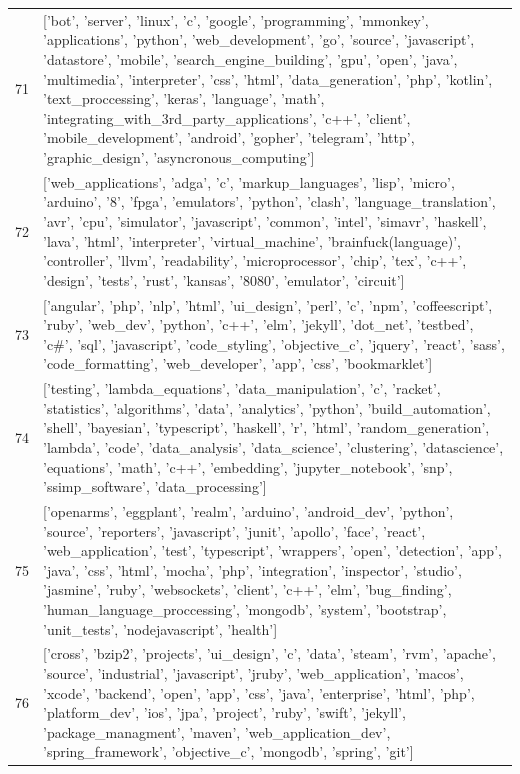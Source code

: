 \begin{center}
\begin{longtable}{|p{1.5cm}|p{12.5cm}|}
            71 & ['bot', 'server', 'linux', 'c', 'google', 'programming', 'mmonkey', 'applications', 'python', 'web\_development', 'go', 'source', 'javascript', 'datastore', 'mobile', 'search\_engine\_building', 'gpu', 'open', 'java', 'multimedia', 'interpreter', 'css', 'html', 'data\_generation', 'php', 'kotlin', 'text\_proccessing', 'keras', 'language', 'math', 'integrating\_with\_3rd\_party\_applications', 'c++', 'client', 'mobile\_development', 'android', 'gopher', 'telegram', 'http', 'graphic\_design', 'asyncronous\_computing']  \\ 
            72 & ['web\_applications', 'adga', 'c', 'markup\_languages', 'lisp', 'micro', 'arduino', '8', 'fpga', 'emulators', 'python', 'clash', 'language\_translation', 'avr', 'cpu', 'simulator', 'javascript', 'common', 'intel', 'simavr', 'haskell', 'lava', 'html', 'interpreter', 'virtual\_machine', 'brainfuck(language)', 'controller', 'llvm', 'readability', 'microprocessor', 'chip', 'tex', 'c++', 'design', 'tests', 'rust', 'kansas', '8080', 'emulator', 'circuit']  \\ 
            73 & ['angular', 'php', 'nlp', 'html', 'ui\_design', 'perl', 'c', 'npm', 'coffeescript', 'ruby', 'web\_dev', 'python', 'c++', 'elm', 'jekyll', 'dot\_net', 'testbed', 'c\#', 'sql', 'javascript', 'code\_styling', 'objective\_c', 'jquery', 'react', 'sass', 'code\_formatting', 'web\_developer', 'app', 'css', 'bookmarklet']  \\ 
            74 & ['testing', 'lambda\_equations', 'data\_manipulation', 'c', 'racket', 'statistics', 'algorithms', 'data', 'analytics', 'python', 'build\_automation', 'shell', 'bayesian', 'typescript', 'haskell', 'r', 'html', 'random\_generation', 'lambda', 'code', 'data\_analysis', 'data\_science', 'clustering', 'datascience', 'equations', 'math', 'c++', 'embedding', 'jupyter\_notebook', 'snp', 'ssimp\_software', 'data\_processing']  \\ 
            75 & ['openarms', 'eggplant', 'realm', 'arduino', 'android\_dev', 'python', 'source', 'reporters', 'javascript', 'junit', 'apollo', 'face', 'react', 'web\_application', 'test', 'typescript', 'wrappers', 'open', 'detection', 'app', 'java', 'css', 'html', 'mocha', 'php', 'integration', 'inspector', 'studio', 'jasmine', 'ruby', 'websockets', 'client', 'c++', 'elm', 'bug\_finding', 'human\_language\_proccessing', 'mongodb', 'system', 'bootstrap', 'unit\_tests', 'nodejavascript', 'health']  \\ 
            76 & ['cross', 'bzip2', 'projects', 'ui\_design', 'c', 'data', 'steam', 'rvm', 'apache', 'source', 'industrial', 'javascript', 'jruby', 'web\_application', 'macos', 'xcode', 'backend', 'open', 'app', 'css', 'java', 'enterprise', 'html', 'php', 'platform\_dev', 'ios', 'jpa', 'project', 'ruby', 'swift', 'jekyll', 'package\_managment', 'maven', 'web\_application\_dev', 'spring\_framework', 'objective\_c', 'mongodb', 'spring', 'git']  \\ 

\end{longtable}
\end{center}
